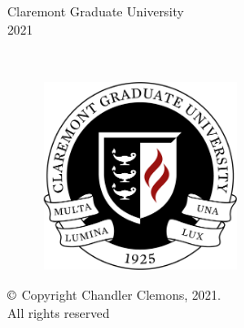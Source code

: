 \documentclass[11pt,a4paper,oldfontcommands]{memoir}
\begin{document}
\date{}
\begin{titlepage}
\thispagestyle{empty}

\begin{center}


\vfill
Claremont Graduate University \\
2021
\end{center}
\end{titlepage}

\clearpage


\thispagestyle{empty}

{%
\sffamily
\centering


~\vspace{\fill}



\begin{figure}[H]
\includegraphics[width=0.5\textwidth]{cgulogo.png} 
\centering
\label{}
\end{figure}



$\copyright$ Copyright Chandler Clemons, 2021. \\
All rights reserved 

}%

\cleardoublepage
\end{document}
